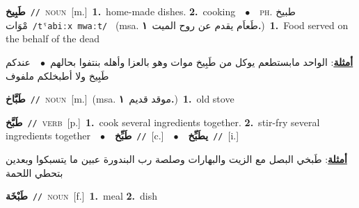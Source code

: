\documentclass[10pt,a4paper,twoside]{article} %
\begin{document}
\begin{multicols}{2}
{\setlength\topsep{0pt}\textbf{\foreignlanguage{arabic}{طَبِيخ}}\ {\color{gray}\texttt{//}\color{black}}\ \textsc{noun}\ [m.]\ \textbf{1.}~home-made dishes.  \textbf{2.}~cooking\ \ $\bullet$\ \ \textsc{ph.} \color{gray} \foreignlanguage{arabic}{طبيخ مْوَات}\color{black}\ {\color{gray}\texttt{/{\sffamily tˤabiːx mwaːt}/}\color{black}}\ \color{gray} (msa. \foreignlanguage{arabic}{طَعاَم يقدم عن روح الميت}~\foreignlanguage{arabic}{\textbf{١.}})\color{black}\ \textbf{1.}~Food served on the behalf of the dead\  \begin{flushright}\color{gray}\foreignlanguage{arabic}{\textbf{\underline{\foreignlanguage{arabic}{أمثلة}}}: الواحد مابستطعم يوكل من طَبِيخ موات وهو بالعزا وأهله بنتفوا بحالهم\ $\bullet$\ \  عندكم طَبِيخ ولا أطبخلكم ملفوف}\end{flushright}\color{black}} \vspace{2mm}

{\setlength\topsep{0pt}\textbf{\foreignlanguage{arabic}{طَبَّاخ}}\ {\color{gray}\texttt{//}\color{black}}\ \textsc{noun}\ [m.]\ \color{gray}(msa. \foreignlanguage{arabic}{موقد قديم}~\foreignlanguage{arabic}{\textbf{١.}})\color{black}\ \textbf{1.}~old stove\ } \vspace{2mm}

{\setlength\topsep{0pt}\textbf{\foreignlanguage{arabic}{طَبَّخ}}\ {\color{gray}\texttt{//}\color{black}}\ \textsc{verb}\ [p.]\ \textbf{1.}~cook several ingredients together.  \textbf{2.}~stir-fry several ingredients together\ \ $\bullet$\ \ \setlength\topsep{0pt}\textbf{\foreignlanguage{arabic}{طَبِّخ}}\ {\color{gray}\texttt{//}\color{black}}\ [c.]\ \ $\bullet$\ \ \setlength\topsep{0pt}\textbf{\foreignlanguage{arabic}{يطَبِّخ}}\ {\color{gray}\texttt{//}\color{black}}\ [i.]\  \begin{flushright}\color{gray}\foreignlanguage{arabic}{\textbf{\underline{\foreignlanguage{arabic}{أمثلة}}}: طَبخي البصل مع الزيت والبهارات وصلصة رب البندورة عبين ما يتسبكوا وبعدين بتحطي اللحمة}\end{flushright}\color{black}} \vspace{2mm}

{\setlength\topsep{0pt}\textbf{\foreignlanguage{arabic}{طَبْخَة}}\ {\color{gray}\texttt{//}\color{black}}\ \textsc{noun}\ [f.]\ \textbf{1.}~meal  \textbf{2.}~dish\ } \vspace{2mm}


\end{multicols}
\end{document}
